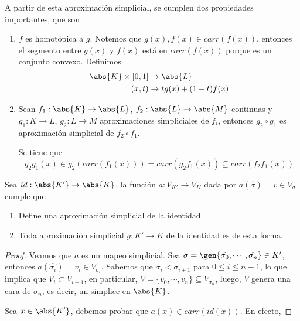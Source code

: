 \documentclass{article}
\begin{document}
\noindent A partir de esta aproximación simplicial, se cumplen dos propiedades importantes, que 
son
\begin{enumerate}
    \item $f$ es homotópica a $g$. Notemos que $g(x),f(x)\in carr(f(x))$, entonces el segmento 
    entre $g(x)$ y $f(x)$ está en $carr(f(x))$ porque es un conjunto convexo. Definimos
    \begin{align*}
        \abs{K}\times[0,1] &\to \abs{L}\\
        (x,t) &\to tg(x)+(1-t)f(x)
    \end{align*}

    \item Sean $f_{1}:\abs{K}\to\abs{L}$, $f_{2}:\abs{L}\to\abs{M}$ continuas y $g_{1}:K\to L$, 
    $g_{2}:L\to M$ aproximaciones simpliciales de $f_{i}$, entonces $g_{2}\circ g_{1}$ es
    aproximación simplicial de $f_{2}\circ f_{1}$.

    Se tiene que
    \begin{equation*}
        g_{2}g_{1}(x)\in g_{2}(carr(f_{1}(x)))=carr(g_{2}f_{1}(x))\subseteq carr(f_{2}f_{1}(x))
    \end{equation*}
\end{enumerate}

\begin{prop}
    Sea $id:\abs{K'}\to\abs{K}$, la función $a:V_{K'}\to V_{K}$ dada por 
    $a(\hat{\sigma})=v\in V_{\sigma}$ cumple que
    \begin{enumerate}
        \item Define una aproximación simplicial de la identidad.
        \item Toda aproximación simplicial $g:K'\to K$ de la identidad es de esta forma.
    \end{enumerate}
\end{prop}

\begin{proof}
    Veamos que $a$ es un mapeo simplicial. Sea $\sigma
    =\gen{\hat{\sigma_{0}},\cdots,\hat{\sigma_{n}}}\in K'$, entonces 
    $a(\hat{\sigma_{i}})=v_{i}\in V_{\sigma_{i}}$. Sabemos que $\sigma_{i}<\sigma_{i+1}$
    para $0\leq i\leq n-1$, lo que implica que $V_{i}\subset V_{i+1}$, en particular, 
    $V=\{v_{0},\cdots,v_{n}\}\subseteq V_{\sigma_{n}}$, luego, $V$ genera una cara de 
    $\sigma_{n}$, es decir, un simplice en $\abs{K}$.

    \vspace{1mm}
    Sea $x\in\abs{K'}$, debemos probar que $a(x)\in carr(id(x))$. En efecto, 
\end{proof}

\end{document}
